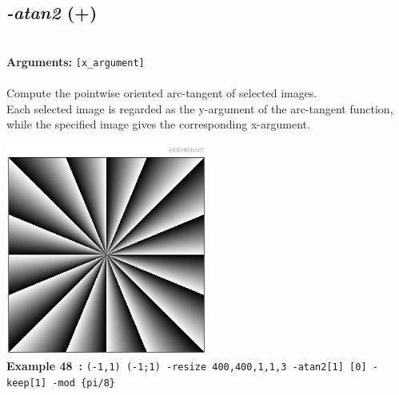 \documentclass[a4paper,11pt,twoside]{book}
\begin{document}
\subsection{\emph{-atan2} (+)}\vspace*{-0.5em}
~\\\textbf{Arguments: } 
{\small \texttt{[x\_argument]}}\\~\\
Compute the pointwise oriented arc-tangent of selected images.
~\\Each selected image is regarded as the y-argument of the arc-tangent function, while the
specified image gives the corresponding x-argument.
\begin{center}\includegraphics[keepaspectratio=true,height=7cm,width=\textwidth]{img/gmic_def48.jpg}\\
{\footnotesize \textbf{Example 48~:} \texttt{(-1,1) (-1;1) -resize 400,400,1,1,3 -atan2[1] [0] -keep[1] -mod \{pi/8\}}}
\end{center}
\end{document}
